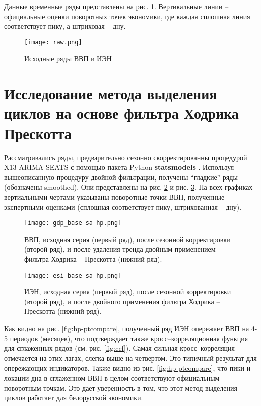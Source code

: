 \documentclass[a4paper,14pt]{extreport}
\begin{document}
	Данные временные ряды представлены на рис. \ref{fig:raw_cycles}. Вертикальные линии – официальные оценки поворотных точек экономики, где каждая сплошная линия соответствует пику, а штриховая – дну.
	
	\begin{figure}
		\label{fig:raw_cycles}
		\texttt{[image: raw.png]}
		\caption{Исходные ряды ВВП и ИЭН}
	\end{figure} 
	
	
	\section{Исследование метода выделения циклов на основе фильтра Ходрика – Прескотта}
	Рассматривались ряды, предварительно сезонно скорректированны процедурой X13-ARIMA-SEATS с помощью пакета Python \textbf{statsmodels} \cite{statsmodels}. Используя вышеописанную процедуру двойной фильтрации, получены “гладкие” ряды (обозначены smoothed). Они представлены на рис. \ref{fig:hp-gdp} и рис. \ref{fig:hp-esi}. На всех графиках вертиальными чертами указываны поворотные точки ВВП, полученные экспертными оценками (сплошная соответствует пику, штрихованная – дну).
	
	\begin{figure}
		\label{fig:hp-gdp}
		\texttt{[image: gdp\_base-sa-hp.png]}
		\caption{ВВП, исходная серия (первый ряд), после сезонной корректировки (второй ряд), и после удаления тренда двойным применением фильтра Ходрика – Прескотта (нижний ряд).}
	\end{figure}
	
	\begin{figure}
		\label{fig:hp-esi}
		\texttt{[image: esi\_base-sa-hp.png]}
		\caption{ИЭН, исходная серия (первый ряд), после сезонной корректировки (второй ряд), и после двойного применения фильтра Ходрика – Прескотта (нижний ряд).}
	\end{figure}
	
	Как видно на рис. \ref{fig:hp-ptcompare}, полученный ряд ИЭН опережает ВВП на 4-5 периодов (месяцев), что подтверждает также кросс–корреляционная функция для сглаженных рядов (см. рис. \ref{fig:ccf}). Самая сильная кросс–корреляция отмечается на этих лагах, слегка выше на четвертом. Это типичный результат для опережающих индикаторов. Также видно из рис. \ref{fig:hp-ptcompare}, что пики и локации дна в сглаженном ВВП в целом соответствуют официальным поворотным точкам. Это дает уверенность в том, что этот метод выделения циклов работает для белорусской экономики.
	
\end{document}
